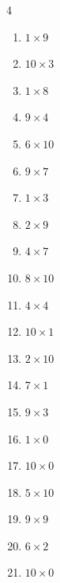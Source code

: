 \begin{multicols}{4}
\begin{enumerate}
  \item $1\times 9$
        \phantom{$=9$}

  \item $10\times 3$
        \phantom{$=30$}

  \item $1\times 8$
        \phantom{$=8$}

  \item $9\times 4$
        \phantom{$=36$}

  \item $6\times 10$
        \phantom{$=60$}

  \item $9\times 7$
        \phantom{$=63$}

  \item $1\times 3$
        \phantom{$=3$}

  \item $2\times 9$
        \phantom{$=18$}

  \item $4\times 7$
        \phantom{$=28$}

  \item $8\times 10$
        \phantom{$=80$}

  \item $4\times 4$
        \phantom{$=16$}

  \item $10\times 1$
        \phantom{$=10$}

  \item $2\times 10$
        \phantom{$=20$}

\columnbreak %

  \item $7\times 1$
        \phantom{$=7$}

  \item $9\times 3$
        \phantom{$=27$}

  \item $1\times 0$
        \phantom{$=0$}

  \item $10\times 0$
        \phantom{$=0$}

  \item $5\times 10$
        \phantom{$=50$}

  \item $9\times 9$
        \phantom{$=81$}

  \item $6\times 2$
        \phantom{$=12$}

  \item $10\times 0$
        \phantom{$=0$}


\end{enumerate}
\end{multicols}
